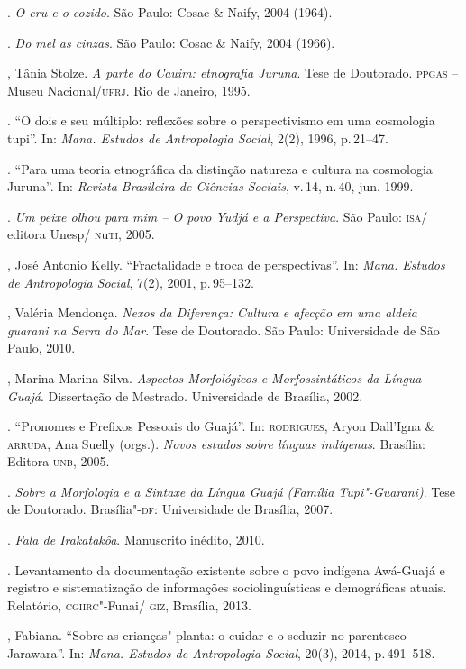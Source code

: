 \begin{bibliohedra}
\titidem. \emph{O cru e o cozido}. São Paulo: Cosac \& Naify, 2004 (1964).

\titidem. \emph{Do mel as cinzas}. São Paulo: Cosac \& Naify, 2004 (1966).

, Tânia Stolze. \emph{A parte do Cauim: etnografia Juruna}. Tese de
Doutorado. \textsc{ppgas} -- Museu Nacional/\textsc{ufrj}. Rio de Janeiro, 1995.

\titidem. ``O dois e seu múltiplo: reflexões sobre o perspectivismo
em uma cosmologia tupi''. In: \emph{Mana. Estudos de Antropologia
Social}, 2(2), 1996, p.\,21--47.

\titidem. ``Para uma teoria etnográfica da distinção natureza e
cultura na cosmologia Juruna''. In: \emph{Revista Brasileira de Ciências
Sociais}, v.\,14, n.\,40, jun. 1999.

\titidem. \emph{Um peixe olhou para mim -- O povo Yudjá e a
Perspectiva}. São Paulo: \textsc{isa}/ editora Unesp/ \textsc{n}u\textsc{ti}, 2005.

, José Antonio Kelly. ``Fractalidade e troca de perspectivas''. In: \emph{Mana. Estudos de Antropologia Social}, 7(2), 2001, p.\,95--132.

, Valéria Mendonça. \emph{Nexos da Diferença: Cultura e afecção em uma aldeia
guarani na Serra do Mar}. Tese de Doutorado. São Paulo: Universidade de São Paulo, 2010.

, Marina Marina Silva. \emph{Aspectos Morfológicos e Morfossintáticos da Língua Guajá}. Dissertação de Mestrado. Universidade de Brasília, 2002.

\titidem. ``Pronomes e Prefixos Pessoais do Guajá''. In: \textsc{rodrigues},
Aryon Dall'Igna \& \textsc{arruda}, Ana Suelly (orgs.). \emph{Novos estudos
sobre línguas indígenas}. Brasília: Editora \textsc{unb}, 2005.

\titidem. \emph{Sobre a Morfologia e a Sintaxe da Língua Guajá
(Família Tupi"-Guarani)}. Tese de Doutorado. Brasília"-\textsc{df}: Universidade de
Brasília, 2007.

\titidem. \emph{Fala de Irakatakôa}. Manuscrito inédito, 2010.

\titidem. Levantamento da documentação existente sobre o povo
indígena Awá-Guajá e registro e sistematização de informações
sociolinguísticas e demográficas atuais. Relatório, \textsc{cgiirc}"-Funai/ \textsc{giz},
Brasília, 2013.

, Fabiana. ``Sobre as crianças"-planta: o cuidar e o seduzir no
parentesco Jarawara''. In: \emph{Mana. Estudos de Antropologia Social}, 20(3), 2014, p.\,491--518.


\end{bibliohedra}
